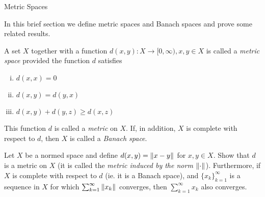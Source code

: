 \begin{section}{Metric Spaces}

	In this brief section we define metric spaces and
	Banach spaces and prove some related results.
	

\begin{defn}
	A set $X$ together with a function $d(x,y):X \rightarrow
	[0,\infty), x,y \in X$
	is called a \emph{metric space} provided the function $d$
	satisfies
		\begin{enumerate}[i)]
			\item
				$d(x,x) = 0$
			\item
				$d(x,y) = d(y,x)$
			\item
				$d(x,y)+d(y,z) \geq d(x,z)$
		\end{enumerate}
	This function $d$ is called a \emph{metric} on $X$. If,
	in addition, $X$ is complete with respect to $d$, then
	$X$ is called a \emph{Banach space}.
\end{defn}


\begin{ex}\label{ex:MetricInducedFromNorm}
	Let $X$ be a normed space and define $d(x,y) = \norm[]{x-y}$
	for $x,y \in X$. Show that $d$ is a metric on $X$ (it is called
	the \emph{metric induced by the norm $\norm[]{\cdot}$}).
	Furthermore, if $X$ is complete with respect to $d$ (ie. it is
	a Banach space), and $\{x_k\}_{k=1}^\infty$ is a sequence in $X$
	for which $\sum_{k=1}^\infty \norm[]{x_k}$ converges, then
	$\sum_{k=1}^\infty x_k$ also converges.
\end{ex}


\end{section}
